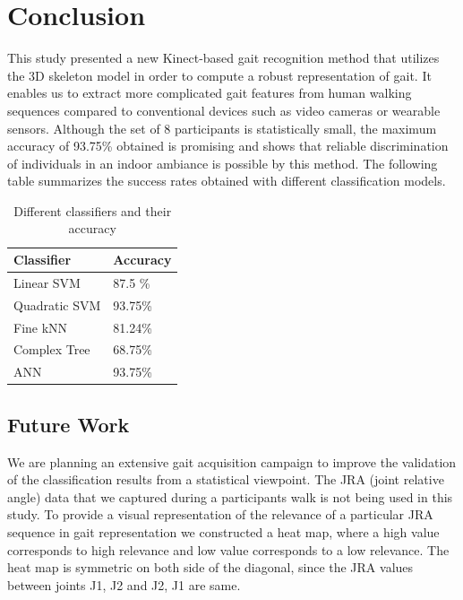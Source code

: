 \chapter{Conclusion} \label{Conclusion}

\noindent This study presented a new Kinect-based gait recognition method that utilizes the 3D skeleton model in order to compute a robust representation of gait. It enables us to extract more complicated gait features from human walking sequences compared to conventional devices such as video cameras or wearable sensors. Although the set of 8 participants is statistically small, the maximum accuracy of 93.75\% obtained is promising and shows that reliable discrimination of individuals in an indoor ambiance is possible by this method. The following table summarizes the success rates obtained with different classification models.

\def\arraystretch{1.3}
\begin{table}[h]
\centering
\begin{tabular}{| p{3cm} | |p{3cm}|}
 \hline
\cellcolor{pink} Classifier & \cellcolor{pink} Accuracy \\ \hline
Linear SVM & 87.5 \% \\ \hline
Quadratic SVM & 93.75\% \\ \hline
Fine kNN & 81.24\% \\\hline
Complex Tree & 68.75\% \\ \hline
ANN & 93.75\% \\ \hline
\end{tabular}
\caption{ Different classifiers and their accuracy}
\end{table}

\newpage
\section{Future Work} \label{Future Work}
\noindent We are planning an extensive gait acquisition campaign to improve the validation of the classification results from a statistical viewpoint. The JRA (joint relative angle) data that we captured during a participants walk is not being used in this study. To provide a visual representation of the relevance of a particular JRA sequence in gait representation we constructed a heat map, where a high value corresponds to high relevance and low value corresponds to a low relevance. The heat map is symmetric on both side of the diagonal, since the JRA values between joints {J1, J2} and {J2, J1} are same.

